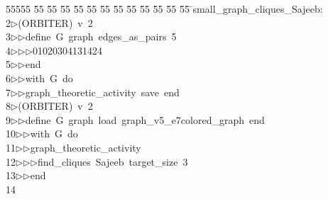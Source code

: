 %
%
\begin{tabbing}
55555 \= 55 \= 55 \= 55 \= 55 \= 55 \= 55 \= 55 \= 55 \= 55 \= 55 \= 55 \= 55 \= \>small\_graph\_cliques\_Sajeeb:\\[0pt]
2\>$\triangleright$\>(ORBITER)\ v\ 2\ \\[0pt]
3\>$\triangleright$\>$\triangleright$\>define\ G\ graph\ edges\_as\_pairs\ 5\ \\[0pt]
4\>$\triangleright$\>$\triangleright$\>$\triangleright$\>01020304131424\ \\[0pt]
5\>$\triangleright$\>$\triangleright$\>end\ \\[0pt]
6\>$\triangleright$\>$\triangleright$\>with\ G\ do\ \\[0pt]
7\>$\triangleright$\>$\triangleright$\>graph\_theoretic\_activity\ save\ end\\[0pt]
8\>$\triangleright$\>(ORBITER)\ v\ 2\ \\[0pt]
9\>$\triangleright$\>$\triangleright$\>define\ G\ graph\ load\ graph\_v5\_e7colored\_graph\ end\ \\[0pt]
10\>$\triangleright$\>$\triangleright$\>with\ G\ do\ \\[0pt]
11\>$\triangleright$\>$\triangleright$\>graph\_theoretic\_activity\ \\[0pt]
12\>$\triangleright$\>$\triangleright$\>$\triangleright$\>find\_cliques\ Sajeeb\ target\_size\ 3\ \\[0pt]
13\>$\triangleright$\>$\triangleright$\>end\\[0pt]
14\>\end{tabbing}
